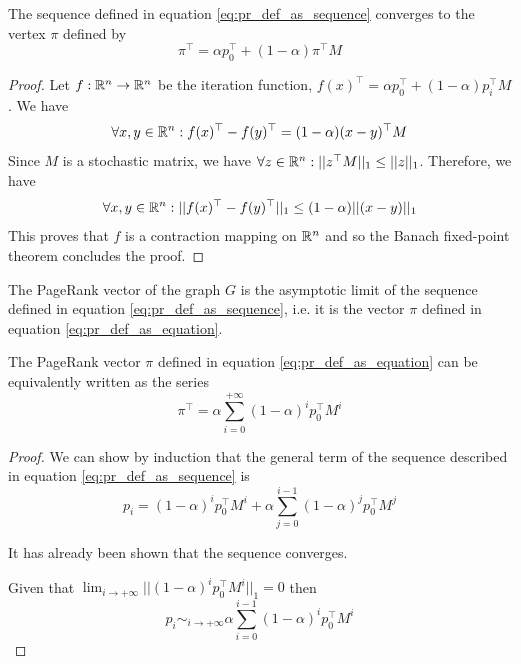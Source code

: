 \begin{property}\label{prop:pr_def_as_equation}
    The sequence defined in equation \ref{eq:pr_def_as_sequence} converges to the vertex $\pi$ defined by 
    \begin{equation}\label{eq:pr_def_as_equation}
        \pi^\top = \alpha p_0^\top + (1-\alpha)\pi^\top M
    \end{equation}
\end{property}
\begin{proof}
    Let $f : \mathbb{R}^n \rightarrow \mathbb{R}^n$ be the iteration function, $f(x)^\top =\alpha p_0^\top + (1-\alpha)p_i^\top M$. We have 
    \begin{equation*}
        \forall x, y \in \mathbb{R}^n : f(x)^\top - f(y)^\top = (1-\alpha)(x-y)^\top M
    \end{equation*}
    Since $M$ is a stochastic matrix, we have $\forall z \in \mathbb{R}^n : ||z^\top M||_1 \leq ||z||_1$. Therefore, we have 
    \begin{equation*}
        \forall x, y \in \mathbb{R}^n : ||f(x)^\top - f(y)^\top||_1 \leq (1-\alpha)||(x-y)||_1
    \end{equation*}
    This proves that $f$ is a contraction mapping on $\mathbb{R}^n$ and so the Banach fixed-point theorem concludes the proof.
\end{proof}

The PageRank vector of the graph $G$ is the asymptotic limit of the sequence defined in equation \ref{eq:pr_def_as_sequence}, i.e. it is the vector $\pi$ defined in equation \ref{eq:pr_def_as_equation}.

\begin{property}\label{prop:pr_def_as_series}
    The PageRank vector $\pi$ defined in equation \ref{eq:pr_def_as_equation} can be equivalently written as the series
    \begin{equation}\label{eq:pr_def_as_series}
        \pi^\top = \alpha \sum_{i = 0}^{+\infty} (1-\alpha)^i p_0^\top M^i
    \end{equation}
\end{property}
\begin{proof}
    We can show by induction that the general term of the sequence described in equation \ref{eq:pr_def_as_sequence} is
    \begin{equation*}
        p_i = (1-\alpha)^i p_0^\top M^i + \alpha \sum_{j = 0}^{i-1} (1-\alpha)^j p_0^\top M^j
    \end{equation*}

    It has already been shown that the sequence converges. 
    
    Given that $\lim_{i \to +\infty} ||(1-\alpha)^i p_0^\top M^i||_1 = 0$ then
    \begin{equation*}
        p_i \sim_{i \to +\infty} \alpha \sum_{i = 0}^{i-1} (1-\alpha)^i p_0^\top M^i
    \end{equation*}
\end{proof}

